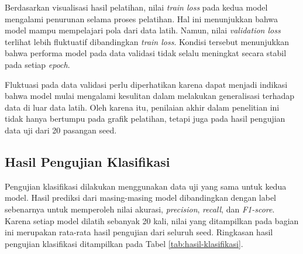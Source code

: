 \begin{sectioncontent}
\begin{subsectioncontent}
        Berdasarkan visualisasi hasil pelatihan, nilai \textit{train loss} pada kedua model mengalami penurunan selama proses pelatihan. Hal ini menunjukkan bahwa model mampu mempelajari pola dari data latih. Namun, nilai \textit{validation loss} terlihat lebih fluktuatif dibandingkan \textit{train loss}. Kondisi tersebut menunjukkan bahwa performa model pada data validasi tidak selalu meningkat secara stabil pada setiap \textit{epoch}.

        Fluktuasi pada data validasi perlu diperhatikan karena dapat menjadi indikasi bahwa model mulai mengalami kesulitan dalam melakukan generalisasi terhadap data di luar data latih. Oleh karena itu, penilaian akhir dalam penelitian ini tidak hanya bertumpu pada grafik pelatihan, tetapi juga pada hasil pengujian data uji dari 20 pasangan seed.
    \end{subsectioncontent}

    \subsection{Hasil Pengujian Klasifikasi}
    \begin{subsectioncontent}
        \hspace{\parindent}Pengujian klasifikasi dilakukan menggunakan data uji yang sama untuk kedua model. Hasil prediksi dari masing-masing model dibandingkan dengan label sebenarnya untuk memperoleh nilai akurasi, \textit{precision}, \textit{recall}, dan \textit{F1-score}. Karena setiap model dilatih sebanyak 20 kali, nilai yang ditampilkan pada bagian ini merupakan rata-rata hasil pengujian dari seluruh seed. Ringkasan hasil pengujian klasifikasi ditampilkan pada Tabel \ref{tab:hasil-klasifikasi}.


\end{subsectioncontent}
\end{sectioncontent}
